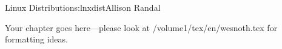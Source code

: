 \begin{aosachapter}{Linux Distribution}{s:lnxdist}{Allison Randal}

Your chapter goes here---please look at /volume1/tex/en/wesnoth.tex for 
formatting ideas.

\end{aosachapter}
